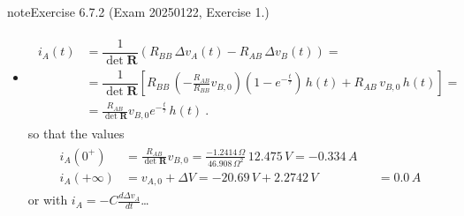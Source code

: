 \documentclass[letterpaper,10pt,english]{jupyterBook}
\begin{document}
\begin{sphinxadmonition}{note}{Exercise 6.7.2 (Exam 2025\sphinxhyphen{}01\sphinxhyphen{}22, Exercise 1.)}
\begin{itemize}
\sphinxAtStartPar
with \(\Delta v_{A,+\infty} = -\frac{R_{AB}}{R_{BB}} v_{B,0} = 2.2742 \, V\). The voltage across the capacitor as a function of time \(t\) thus reads
\begin{equation*}
\begin{split}\begin{aligned}
     v_A(t) 
     & = v_{A,0} + \Delta v_A(t) = \\
     & = v_{A,0} + \Delta v_{A,+\infty} \left( 1 - e^{-\frac{t}{\tau}} \right) \, h(t) \ ,
   \end{aligned}\end{split}
\end{equation*}
\sphinxAtStartPar
so that the values
\begin{equation*}
\begin{split}\begin{aligned} 
     v_A(0^+) & = v_{A,0}  && = -20.69 \, V \\
     v_A(+\infty) & = v_{A,0} + \Delta V = -20.69 \, V + 2.2742 \, V && = -18.4158 \, V
   \end{aligned}\end{split}
\end{equation*}
\item {} 
\sphinxAtStartPar
{}
\begin{equation*}
\begin{split}\begin{aligned}
      i_A(t)
      & = \dfrac{1}{\det \mathbf{R}} \left( R_{BB} \, \Delta v_A(t) - R_{AB} \, \Delta v_B(t) \right) = \\
      & = \dfrac{1}{\det \mathbf{R}} \left[ R_{BB} \, \left( -\frac{R_{AB}}{R_{BB}} v_{B,0} \right) \left( 1 - e^{-\frac{t}{\tau}} \right) \, h(t)  + R_{AB} \, v_{B,0} \, h(t) \right] = \\
      & = \frac{R_{AB}}{\det \mathbf{R}} v_{B,0} e^{-\frac{t}{\tau}} \, h(t) \ .
   \end{aligned}\end{split}
\end{equation*}
\sphinxAtStartPar
so that the values
\begin{equation*}
\begin{split}\begin{aligned} 
     i_A(0^+) & = \frac{R_{AB}}{\det \mathbf{R}} v_{B,0} = \frac{-1.2414 \, \Omega}{46.908 \, \Omega^2} \, 12.475 \, V = -0.334 \, A \\
     i_A(+\infty) & = v_{A,0} + \Delta V = -20.69 \, V + 2.2742 \, V && = 0.0 \, A
   \end{aligned}\end{split}
\end{equation*}
\sphinxAtStartPar
or with \(i_A = - C \frac{d \Delta v_A}{dt}\)…


\end{itemize}
\end{sphinxadmonition}
\end{document}
